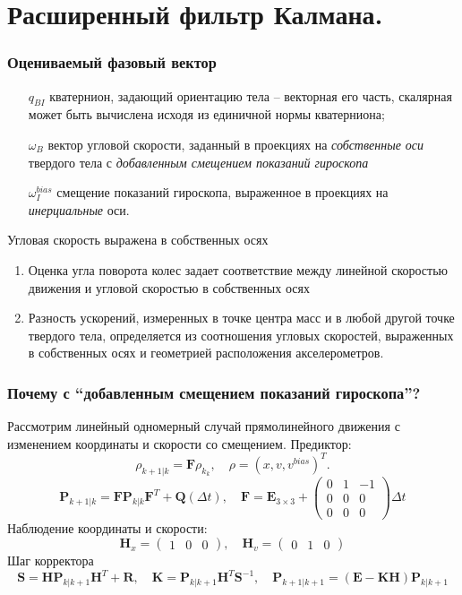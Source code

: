 \documentclass[utf8]{beamer}
\begin{document}
\section{Расширенный фильтр Калмана. }
\begin{frame}
\frametitle{Оцениваемый фазовый вектор}

\begin{itemize}
\item[$q_{BI}$] кватернион, задающий ориентацию тела -- векторная его часть,
    скалярная может быть вычислена исходя из единичной нормы кватерниона;
\item[$\omega_B$] вектор угловой скорости, заданный в проекциях на \emph{собственные
    оси} твердого тела с \emph{добавленным смещением показаний гироскопа}
\item[$\omega_{I}^{bias}$] смещение показаний гироскопа, выраженное в
    проекциях на \emph{инерциальные} оси.
\end{itemize}
Угловая скорость выражена в собственных осях
\begin{enumerate}
    \item Оценка угла поворота колес задает соответствие между линейной
        скоростью движения и угловой скоростью в собственных осях
    \item Разность ускорений, измеренных в точке центра масс и в любой другой
        точке твердого тела, определяется из соотношения угловых скоростей,
        выраженных в собственных осях и геометрией расположения
        акселерометров.
\end{enumerate}
\end{frame}
\begin{frame}
\frametitle{Почему с ``добавленным смещением показаний гироскопа''?}
Рассмотрим линейный одномерный случай прямолинейного движения с изменением
координаты и скорости со смещением. Предиктор:
$$
\rho_{k+1|k} = \mathbf{F}\rho_{k_k}, \quad \rho = \left(x, v,
v^{bias}\right)^T.
$$
$$
\mathbf{P}_{k+1|k} = \mathbf{FP}_{k|k}\mathbf{F}^T + \mathbf{Q}\left(\Delta
t\right),\quad
\mathbf{F} = \mathbf{E}_{3\times 3} + \left(\begin{array}{ccc}
0 & 1 & -1 \\
0 & 0 & 0 \\
0 & 0 & 0
\end{array}\right)\Delta t
$$
Наблюдение координаты и скорости:
$$
\mathbf{H}_x = \left(\begin{array}{ccc} 1 & 0 & 0\end{array}\right),\quad
\mathbf{H}_v = \left(\begin{array}{ccc} 0 & 1 & 0\end{array}\right)
$$
Шаг корректора
$$
\mathbf{S} = \mathbf{HP}_{k|k+1}
\mathbf{H}^T + \mathbf{R},\quad
\mathbf{K} = \mathbf{P}_{k|k+1}
\mathbf{H}^T\mathbf{S}^{-1},\quad
\mathbf{P}_{k+1|k+1} = 
\left(\mathbf{E}-\mathbf{KH}\right)\mathbf{P}_{k|k+1}
$$
\end{frame}
\end{document}
